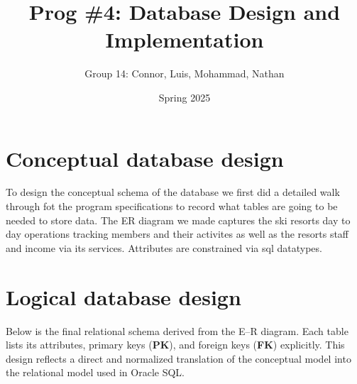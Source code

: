 \documentclass[11pt]{scrartcl}
\title{Prog \#4: Database Design and Implementation}
\author{Group 14: Connor, Luis, Mohammad, Nathan}
\date{Spring 2025}
\begin{document}
\maketitle
\tableofcontents

\section{Conceptual database design}
To design the conceptual schema of the database we first did a detailed walk through fot the program specifications to record what tables are going to be needed to store data. 
The ER diagram we made captures the ski resorts day to day operations tracking members and their activites as well as the resorts staff and income via its services. Attributes
are constrained via sql datatypes.
\section{Logical database design}

Below is the final relational schema derived from the E--R diagram. Each table lists its attributes, primary keys (\textbf{PK}), and foreign keys (\textbf{FK}) explicitly. 
This design reflects a direct and normalized translation of the conceptual model into the relational model used in Oracle SQL.
\end{document}
